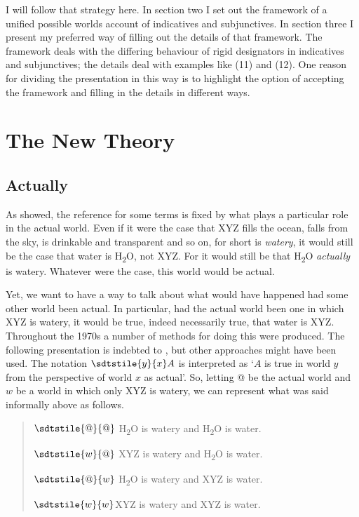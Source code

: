 I will follow that strategy here. In section two I set out the framework of a unified possible worlds account of indicatives and subjunctives. In section three I present my preferred way of filling out the details of that framework. The framework deals with the differing behaviour of rigid designators in indicatives and subjunctives; the details deal with examples like (11) and (12). One reason for dividing the presentation in this way is to highlight the option of accepting the framework and filling in the details in different ways.

\section{The New Theory}
\subsection{Actually}
As \citet{Kripke1980} showed, the reference for some terms is fixed by what plays a particular role in the actual world. Even if it were the case that XYZ fills the ocean, falls from the sky, is drinkable and transparent and so on, for short is \textit{watery}, it would still be the case that water is H\textsubscript{2}O, not XYZ. For it would still be that H\textsubscript{2}O \textit{actually} is watery. Whatever were the case, this world would be actual.

Yet, we want to have a way to talk about what would have happened had some other world been actual. In particular, had the actual world been one in which XYZ is watery, it would be true, indeed necessarily true, that water is XYZ. Throughout the 1970s a number of methods for doing this were produced. The following presentation is indebted to \citet{Davies1980}, but other approaches might have been used. The notation \(\sdtstile{y}{x} A\) is interpreted as `\(A\) is true in world \(y\) from the perspective of world \(x\) as actual'. So, letting @ be the actual world and \(w\) be a world in which only XYZ is watery, we can represent what was said informally above as follows.

\begin{quote}
\(\sdtstile{@}{@}\) H\textsubscript{2}O is watery and H\textsubscript{2}O is water.

\(\sdtstile{w}{@}\) XYZ is watery and H\textsubscript{2}O is water.

\(\sdtstile{@}{w}\) H\textsubscript{2}O is watery and XYZ is water.

\(\sdtstile{w}{w}\)XYZ is watery and XYZ is water.
\end{quote}

